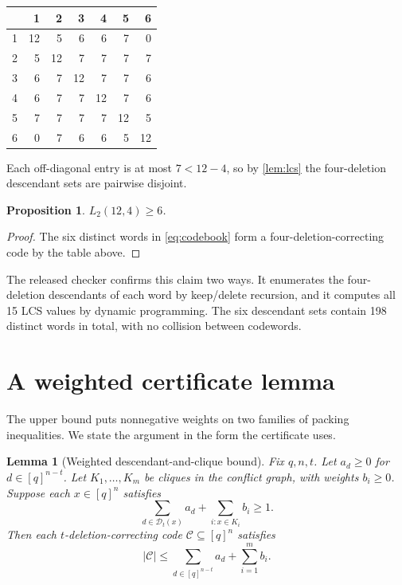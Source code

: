 \documentclass[11pt]{article}
\newtheorem{proposition}[theorem]{Proposition}
\newtheorem{lemma}[theorem]{Lemma}
\theoremstyle{definition}
\newcommand{\D}{\mathcal{D}}
\newcommand{\C}{\mathcal{C}}
\begin{document}
\begin{center}
\begin{tabular}{c@{\qquad}rrrrrr}
\toprule
 & 1 & 2 & 3 & 4 & 5 & 6\\
\midrule
1 & 12 & 5 & 6 & 6 & 7 & 0\\
2 & 5 & 12 & 7 & 7 & 7 & 7\\
3 & 6 & 7 & 12 & 7 & 7 & 6\\
4 & 6 & 7 & 7 & 12 & 7 & 6\\
5 & 7 & 7 & 7 & 7 & 12 & 5\\
6 & 0 & 7 & 6 & 6 & 5 & 12\\
\bottomrule
\end{tabular}
\end{center}

Each off-diagonal entry is at most $7<12-4$, so by \cref{lem:lcs} the
four-deletion descendant sets are pairwise disjoint.

\begin{proposition}\label{prop:lower}
$L_2(12,4)\geq6$.
\end{proposition}

\begin{proof}
The six distinct words in \eqref{eq:codebook} form a four-deletion-correcting
code by the table above.
\end{proof}

The released checker confirms this claim two ways.  It enumerates the
four-deletion descendants of each word by keep/delete recursion, and it
computes all 15 LCS values by dynamic programming.  The six descendant sets
contain 198 distinct words in total, with no collision between codewords.

\section{A weighted certificate lemma}

The upper bound puts nonnegative weights on two families of packing
inequalities.  We state the argument in the form the certificate uses.

\begin{lemma}[Weighted descendant-and-clique bound]\label{lem:weighted}
Fix $q,n,t$.  Let $a_d\geq0$ for $d\in[q]^{n-t}$.  Let
$K_1,\dots,K_m$ be cliques in the conflict graph, with weights $b_i\geq0$.
Suppose each $x\in[q]^n$ satisfies
\begin{equation}\label{eq:coverage}
  \sum_{d\in\D_t(x)}a_d+\sum_{i:x\in K_i}b_i\geq1.
\end{equation}
Then each $t$-deletion-correcting code $\C\subseteq[q]^n$ satisfies
\begin{equation}\label{eq:weightedbound}
  |\C|\leq \sum_{d\in[q]^{n-t}}a_d+\sum_{i=1}^m b_i.
\end{equation}
\end{lemma}
\end{document}

